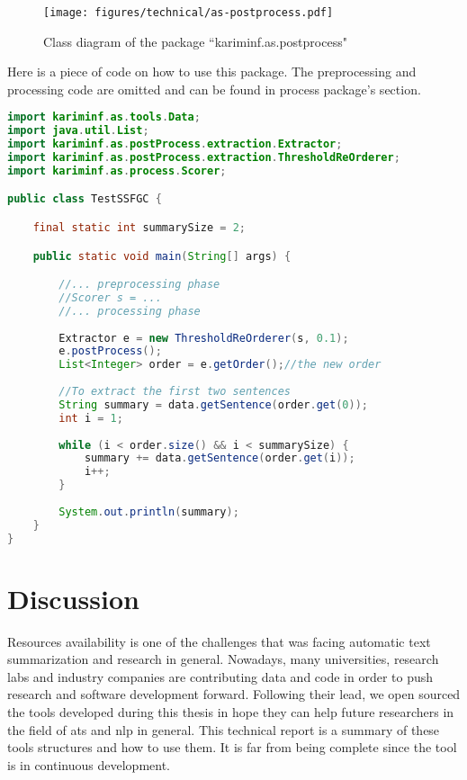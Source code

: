 \begin{figure}[!ht]
	\begin{center}
		\texttt{[image: figures/technical/as-postprocess.pdf]}
	\end{center}
	\caption{\label{fig:as-postprocess} Class diagram of the package ``kariminf.as.postprocess"}
\end{figure}

Here is a piece of code on how to use this package. 
The preprocessing and processing code are omitted and can be found in process package's section.  
\begin{lstlisting}[language={Java}, style=codeStyle]
import kariminf.as.tools.Data;
import java.util.List;
import kariminf.as.postProcess.extraction.Extractor;
import kariminf.as.postProcess.extraction.ThresholdReOrderer;
import kariminf.as.process.Scorer;

public class TestSSFGC {

    final static int summarySize = 2;

    public static void main(String[] args) {

        //... preprocessing phase
        //Scorer s = ...
        //... processing phase
        
        Extractor e = new ThresholdReOrderer(s, 0.1);
        e.postProcess();
        List<Integer> order = e.getOrder();//the new order 
        
        //To extract the first two sentences
        String summary = data.getSentence(order.get(0));
        int i = 1;
        
        while (i < order.size() && i < summarySize) {
            summary += data.getSentence(order.get(i));
            i++;
        }
        
        System.out.println(summary);
    }
}
\end{lstlisting}


\section{Discussion}

Resources availability is one of the challenges that was facing automatic text summarization and research in general. 
Nowadays, many universities, research labs and industry companies are contributing data and code in order to push research and software development forward. 
Following their lead, we open sourced the tools developed during this thesis in hope they can help future researchers in the field of \ac{ats} and \ac{nlp} in general. 
This technical report is a summary of these tools structures and how to use them. 
It is far from being complete since the tool is in continuous development.






